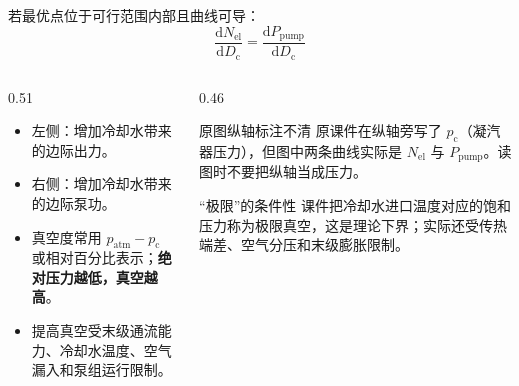 \begin{frame}[t,shrink]{}
若最优点位于可行范围内部且曲线可导：
$$
\frac{\mathrm{d}N_{\mathrm{el}}}{\mathrm{d}D_{\mathrm{c}}}
=\frac{\mathrm{d}P_{\mathrm{pump}}}{\mathrm{d}D_{\mathrm{c}}}
$$
\begin{columns}[T,onlytextwidth]
\begin{column}{0.51\textwidth}
  \begin{itemize}
    \item 左侧：增加冷却水带来的边际出力。
    \item 右侧：增加冷却水带来的边际泵功。
    \item 真空度常用 \(p_{\mathrm{atm}}-p_{\mathrm{c}}\) 或相对百分比表示；\textbf{绝对压力越低，真空越高}。
    \item 提高真空受末级通流能力、冷却水温度、空气漏入和泵组运行限制。
  \end{itemize}
\end{column}
\begin{column}{0.46\textwidth}
  \begin{amberbox}{原图纵轴标注不清}
  \small 原课件在纵轴旁写了 \(p_{\mathrm{c}}\)（凝汽器压力），但图中两条曲线实际是 \(N_{\mathrm{el}}\) 与 \(P_{\mathrm{pump}}\)。读图时不要把纵轴当成压力。
  \end{amberbox}
  \vspace{0.7mm}
  \begin{keybox}{“极限”的条件性}
  \small 课件把冷却水进口温度对应的饱和压力称为极限真空，这是理论下界；实际还受传热端差、空气分压和末级膨胀限制。
  \end{keybox}
\end{column}
\end{columns}
\end{frame}

